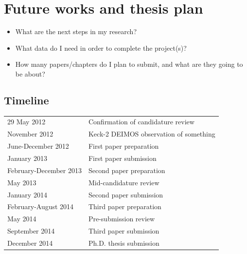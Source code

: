 \documentclass[useAMS,usenatbib,onecolumn]{mnras}
\begin{document}
\section{Future works and thesis plan}
\label{sec:future}
\begin{itemize}
	\item{What are the next steps in my research?}
	\item{What data do I need in order to complete the project(s)?}
	\item{How many papers/chapters do I plan to submit, and what are they going to be about?}
\end{itemize}


\subsection*{Timeline}

\begin{tabular*}{0.75\textwidth}{ l l }
  29 May 2012 								& Confirmation of candidature review \\
  November 2012								& Keck-2 DEIMOS observation of something \\
  June-December 2012						& First paper preparation \\
  January 2013								& First paper submission\\
  February-December 2013					& Second paper preparation \\
  May 2013 		 							& Mid-candidature review \\
  January 2014								& Second paper submission \\
  February-August 2014		    			& Third paper preparation \\
  May 2014  								& Pre-submission review \\
  September 2014							& Third paper submission \\
  December 2014  							& Ph.D. thesis submission \\
\end{tabular*}

\begin{multicols}{2}
	
	{\footnotesize
	\setlength{\itemsep}{1pt}
	\begin{spacing}{0.5}
		{}
	\end{spacing}	}
\end{multicols}
\end{document}
